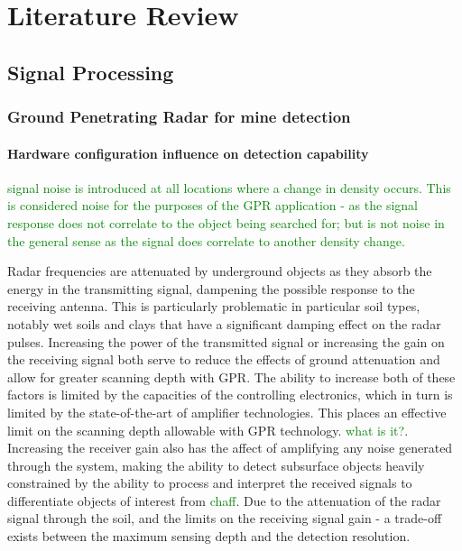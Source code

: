 \documentclass[main.tex]{subfiles}
\begin{document}
\chapter{Literature Review}
\section{Signal Processing}
% 
\subsection{Ground Penetrating Radar for mine detection}
\subsubsection{Hardware configuration influence on detection capability}
\textcolor{green}{signal noise is introduced at all locations where a change in density occurs. This is considered noise for the purposes of the GPR application - as the signal response does not correlate to the object being searched for; but is not noise in the general sense as the signal does correlate to another density change.}

Radar frequencies are attenuated by underground objects as they absorb the energy in the transmitting signal, dampening the possible response to the receiving antenna. This is particularly problematic in particular soil types, notably wet soils and clays that have a significant damping effect on the radar pulses. Increasing the power of the transmitted signal or increasing the gain on the receiving signal both serve to reduce the effects of ground attenuation and allow for greater scanning depth with GPR. The ability to increase both of these factors is limited by the capacities of the controlling electronics, which in turn is limited by the state-of-the-art of amplifier technologies. This places an effective limit on the scanning depth allowable with GPR technology. \textcolor{green}{what is it?}. Increasing the receiver gain also has the affect of amplifying any noise generated through the system, making the ability to detect subsurface objects heavily constrained by the ability to process and interpret the received signals to differentiate objects of interest from \textcolor{green}{chaff}. Due to the attenuation of the radar signal through the soil, and the limits on the receiving signal gain - a trade-off exists between the maximum sensing depth and the detection resolution.
\end{document}
